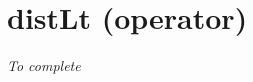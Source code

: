 \section{distLt (operator)}\label{distlt:distltoperator}\hypertarget{distlt:distltoperator}{}

\emph{To complete}